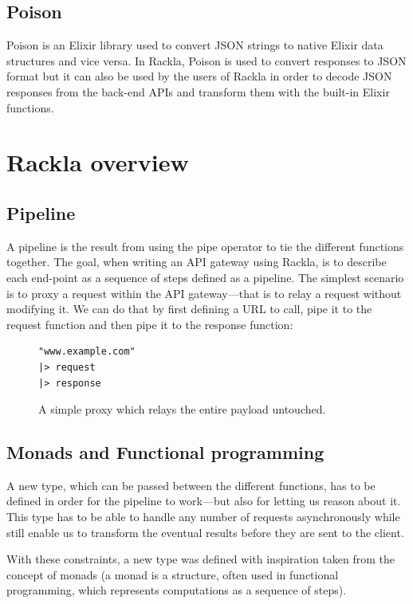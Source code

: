 \documentclass{cslthse-msc}
\begin{document}
\subsection{Poison}
Poison is an Elixir library used to convert JSON strings to native Elixir data structures and vice versa. In Rackla, Poison is used to convert responses to JSON format but it can also be used by the users of Rackla in order to decode JSON responses from the back-end APIs and transform them with the built-in Elixir functions.

\section{Rackla overview}

\subsection{Pipeline}
A pipeline is the result from using the pipe operator to tie the different functions together. The goal, when writing an API gateway using Rackla, is to describe each end-point as a sequence of steps defined as a pipeline. The simplest scenario is to proxy a request within the API gateway---that is to relay a request without modifying it. We can do that by first defining a URL to call, pipe it to the request function and then pipe it to the response function:

\begin{figure}[H]
  \centering
\begin{lstlisting}[breaklines=true,frame=single]
"www.example.com"
|> request
|> response
\end{lstlisting}
  \caption{A simple proxy which relays the entire payload untouched.}
\end{figure}

\subsection{Monads and Functional programming}
A new type, which can be passed between the different functions, has to be defined in order for the pipeline to work---but also for letting us reason about it. This type has to be able to handle any number of requests asynchronously while still enable us to transform the eventual results before they are sent to the client.

With these constraints, a new type was defined with inspiration taken from the concept of monads (a monad is a structure, often used in functional programming, which represents computations as a sequence of steps).
\end{document}
